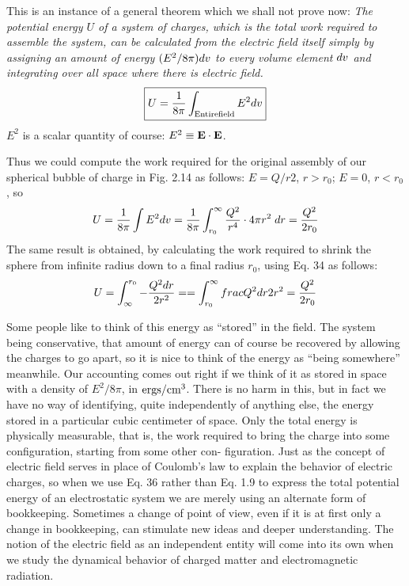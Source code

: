 This is an instance of a general theorem which we shall not prove
now: \emph{The potential energy $U$ of a system of charges, which is the total
work required to assemble the system, can be calculated from the electric
field itself simply by assigning an amount of energy $(E^2/8\pi)d v$ to
every volume element $d v$ and integrating over all space where there
is electric field.}
\begin{equation}
\boxed{
  U = \frac{1}{8\pi}\int_{\text{Entire\\field}} E^2d v
}
\end{equation}
\noindent $E^2$ is a scalar quantity of course: $E^2\equiv\mathbf{E}\cdot\mathbf{E}$.

Thus we could compute the work required for the original assembly
of our spherical bubble of charge in Fig. 2.14 as follows: $E = Q/r2$,
$r>r_0$; $E =0$, $r<r_0$, so
\begin{equation}
  U = \frac{1}{8\pi}\int E^2d v = \frac{1}{8\pi}\int_{r_0}^\infty \frac{Q^2}{r^4}\cdot 4\pi r^2\;d r
       = \frac{Q^2}{2r_0}
\end{equation}
The same result is obtained, by calculating the work required to
shrink the sphere from infinite radius down to a final radius $r_0$, using
Eq. 34 as follows:
\begin{equation}
  U = \int_{\infty}^{r_0}-\frac{Q^2d r}{2 r^2} = 
    = \int_{r_0}^\infty \\frac{Q^2d r}{2 r^2}
    = \frac{Q^2}{2r_0}
\end{equation}


Some people like to think of this energy as ``stored'' in the field.
The system being conservative, that amount of energy can of course
be recovered by allowing the charges to go apart, so it is nice to think
of the energy as ``being somewhere'' meanwhile. Our accounting
comes out right if we think of it as stored in space with a density of
$E^2/8\pi$, in $\textup{ergs}/\textup{cm}^3$. There is no harm in this, but in fact we have no
way of identifying, quite independently of anything else, the energy
stored in a particular cubic centimeter of space. Only the total
energy is physically measurable, that is, the work required to bring
the charge into some configuration, starting from some other con-
figuration. Just as the concept of electric field serves in place of
Coulomb's law to explain the behavior of electric charges, so when
we use Eq. 36 rather than Eq. 1.9 to express the total potential energy
of an electrostatic system we are merely using an alternate form of
bookkeeping. Sometimes a change of point of view, even if it is at
first only a change in bookkeeping, can stimulate new ideas and
deeper understanding. The notion of the electric field as an independent
entity will come into its own when we study the dynamical
behavior of charged matter and electromagnetic radiation.

